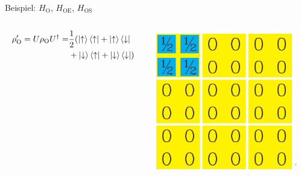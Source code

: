 \begin{frame}{Beispiel: $H_{\mathrm{O}}$, $H_{\mathrm{OE}}$, $H_{\mathrm{OS}}$}
{\begin{columns}
\begin{column}{0.55\textwidth}
\begin{beamerboxesrounded}{}
\begin{align*}
							\rho^{\prime}_{\mathrm{O}} = U\rho_{\mathrm{O}}U^{\dagger}
							=&\frac{1}{2}(\ket{\uparrow}\bra{\uparrow} + \ket{\uparrow}\bra{\downarrow} \\ &+ \ket{\downarrow}\bra{\uparrow} + \ket{\downarrow}\bra{\downarrow})
							\end{align*}
							\vspace{-0.5cm}
						\end{beamerboxesrounded}
					\end{column}
					\begin{column}{0.35\textwidth}
						 \centering
						 \includegraphics[scale=0.35]{graphics/subsystem_example_1_2.jpg}
					\end{column}
				\end{columns}}{}
				

\end{frame}
